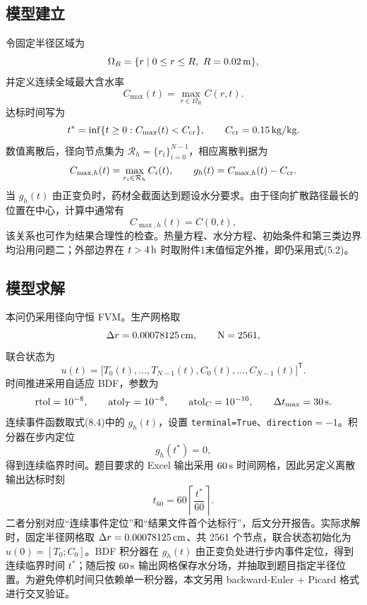 \documentclass[UTF8,a4paper,12pt]{ctexart}
\numberwithin{equation}{section}
\begin{document}
\subsection{模型建立}
令固定半径区域为
\begin{equation}
  \Omega_R=\{r\mid 0\le r\le R,\ R=0.02\rm\,m\},
\end{equation}
并定义连续全域最大含水率
\begin{equation}
  C_{\max}(t)=\max_{r\in\Omega_R}C(r,t).
\end{equation}
达标时间写为
\begin{equation}
  t^*=\inf\{t\ge0: C_{\max}(t)<C_{\rm cr}\},\qquad C_{\rm cr}=0.15\rm\,kg/kg.
\end{equation}
数值离散后，径向节点集为 $\mathcal R_h=\{r_i\}_{i=0}^{N-1}$，相应离散判据为
\begin{equation}
  C_{\max,h}(t)=\max_{r_i\in\mathcal R_h}C_i(t),\qquad
  g_h(t)=C_{\max,h}(t)-C_{\rm cr}.
\end{equation}
当 $g_h(t)$ 由正变负时，药材全截面达到题设水分要求。由于径向扩散路径最长的位置在中心，计算中通常有
\begin{equation}
  C_{\max,h}(t)=C(0,t),
\end{equation}
该关系也可作为结果合理性的检查。热量方程、水分方程、初始条件和第三类边界均沿用问题二；外部边界在 $t>4\rm\,h$ 时取附件1末值恒定外推，即仍采用式(5.2)。

\subsection{模型求解}
本问仍采用径向守恒 FVM。生产网格取
\begin{equation}
  \Delta r=0.00078125\rm\,cm,
  \qquad N=2561,
\end{equation}
联合状态为
\begin{equation}
  u(t)=\bigl[T_0(t),\ldots,T_{N-1}(t),C_0(t),\ldots,C_{N-1}(t)\bigr]^{\mathsf T}.
\end{equation}
时间推进采用自适应 BDF，参数为
\begin{equation}
  \mathrm{rtol}=10^{-8},\qquad
  \mathrm{atol}_T=10^{-8},\qquad
  \mathrm{atol}_C=10^{-10},\qquad
  \Delta t_{\max}=30\rm\,s.
\end{equation}
连续事件函数取式(8.4)中的 $g_h(t)$，设置 \texttt{terminal=True}、\texttt{direction}$=-1$。积分器在步内定位
\begin{equation}
  g_h(t^*)=0,
\end{equation}
得到连续临界时间。题目要求的 Excel 输出采用 $60\rm\,s$ 时间网格，因此另定义离散输出达标时刻
\begin{equation}
  t_{60}=60\left\lceil\frac{t^*}{60}\right\rceil.
\end{equation}
二者分别对应“连续事件定位”和“结果文件首个达标行”，后文分开报告。实际求解时，固定半径网格取 $\Delta r=0.00078125\rm\,cm$、共 2561 个节点，联合状态初始化为 $u(0)=[T_0;C_0]$。BDF 积分器在 $g_h(t)$ 由正变负处进行步内事件定位，得到连续临界时间 $t^*$；随后按 $60\rm\,s$ 输出网格保存水分场，并抽取到题目指定半径位置。为避免停机时间只依赖单一积分器，本文另用 backward-Euler + Picard 格式进行交叉验证。
\end{document}
